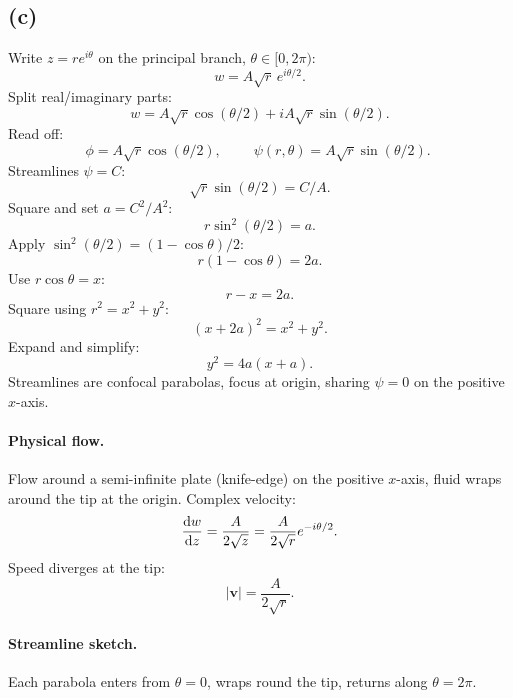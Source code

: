 \documentclass[11pt]{article}
\begin{document}
\subsection*{(c)}

Write $z=re^{i\theta}$ on the principal branch, $\theta\in[0,2\pi)$:
\[ w = A\sqrt{r}\,e^{i\theta/2}. \]
Split real/imaginary parts:
\[ w = A\sqrt{r}\cos(\theta/2) + iA\sqrt{r}\sin(\theta/2). \]
Read off:
\[ \phi = A\sqrt{r}\cos(\theta/2),\qquad \boxed{\;\psi(r,\theta) = A\sqrt{r}\sin(\theta/2).\;} \]
Streamlines $\psi=C$:
\[ \sqrt{r}\sin(\theta/2) = C/A. \]
Square and set $a = C^{2}/A^{2}$:
\[ r\sin^{2}(\theta/2) = a. \]
Apply $\sin^{2}(\theta/2)=(1-\cos\theta)/2$:
\[ r(1-\cos\theta) = 2a. \]
Use $r\cos\theta = x$:
\[ r - x = 2a. \]
Square using $r^{2}=x^{2}+y^{2}$:
\[ (x+2a)^{2} = x^{2}+y^{2}. \]
Expand and simplify:
\[ y^{2} = 4a(x+a). \]
Streamlines are confocal parabolas, focus at origin, sharing $\psi=0$ on the positive $x$-axis.

\paragraph{Physical flow.} Flow around a semi-infinite plate (knife-edge) on the positive $x$-axis, fluid wraps around the tip at the origin. Complex velocity:
\[ \dv{w}{z} = \frac{A}{2\sqrt{z}} = \frac{A}{2\sqrt{r}}e^{-i\theta/2}. \]
Speed diverges at the tip:
\[ |\bm v| = \frac{A}{2\sqrt{r}}. \]

\paragraph{Streamline sketch.}
\begin{center}
\end{center}
Each parabola enters from $\theta=0$, wraps round the tip, returns along $\theta=2\pi$.
\end{document}

